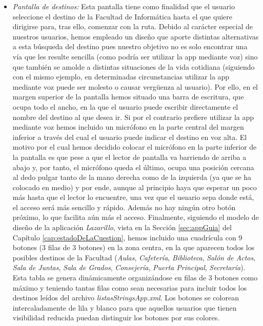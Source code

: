 \begin{itemize}
	\item \textit{Pantalla de destinos:} Esta pantalla tiene como finalidad que el usuario seleccione el destino de la Facultad de Informática hasta el que quiere dirigirse para, tras ello, comenzar con la ruta. Debido al carácter especial de nuestros usuarios, hemos empleado un diseño que aporte distintas alternativas a esta búsqueda del destino pues nuestro objetivo no es solo encontrar una vía que les resulte sencilla (como podría ser utilizar la app mediante voz) sino que también se amolde a distintas situaciones de la vida cotidiana (siguiendo con el mismo ejemplo, en determinadas circunstancias utilizar la app mediante voz puede ser molesto o causar vergüenza al usuario). Por ello, en el margen superior de la pantalla hemos situado una barra de escritura, que ocupa todo el ancho, en la que el usuario puede escribir directamente el nombre del destino al que desea ir. Si por el contrario prefiere utilizar la app mediante voz hemos incluido un micrófono en la parte central del margen inferior a través del cual el usuario puede indicar el destino en voz alta. El motivo por el cual hemos decidido colocar el micrófono en la parte inferior de la pantalla es que pese a que el lector de pantalla va barriendo de arriba a abajo y, por tanto, el micrófono queda el último, ocupa una posición cercana al dedo pulgar tanto de la mano derecha como de la izquierda (ya que se ha colocado en medio) y por ende, aunque al principio haya que esperar un poco más hasta que el lector lo encuentre, una vez que el usuario sepa donde está, el acceso será más sencillo y rápido. Además no hay ningún otro botón próximo, lo que facilita aún más el acceso. Finalmente, siguiendo el modelo de diseño de la aplicación \textit{Lazarillo}, vista en la Sección \ref{sec:appGuia} del Capítulo \ref{cap:estadoDeLaCuestion}, hemos incluido una cuadrícula con 9 botones (3 filas de 3 botones) en la zona centra, en la que aparecen todos los posibles destinos de la Facultad (\textit{Aulas}, \textit{Cafetería}, \textit{Biblioteca}, \textit{Salón de Actos}, \textit{Sala de Juntas}, \textit{Sala de Grados}, \textit{Consejería},\textit{ Puerta Principal}, \textit{Secretaría}). Esta tabla se genera dinámicamente organizándose en filas de 3 botones como máximo y teniendo tantas filas como sean necesarias para incluir todos los destinos leídos del archivo \textit{listasStringsApp.xml}. Los botones se colorean intercaladamente de lila y blanco para que aquellos usuarios que tienen visibilidad reducida puedan distinguir los botones por sus colores. 
	

\end{itemize}
